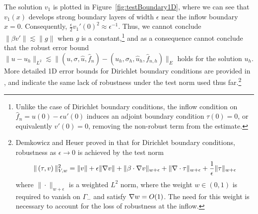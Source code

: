 The solution $v_1$ is plotted in Figure~\ref{fig:testBoundary1D}, where we can see that $v_1(x)$ develops strong boundary layers of width $\epsilon$ near the inflow boundary $x=0$. Consequently, $\frac{\epsilon}{2} v_1'(0)^2 \approx \epsilon^{-1}$. Thus, we cannot conclude $\|\beta v'\| \lesssim \|g\|$ when $g$ is a constant,\footnote{Unlike the case of Dirichlet boundary conditions, the inflow condition on $ \widehat{f}_n = u(0)-\epsilon u'(0)$ induces an adjoint boundary condition $\tau(0)=0$, or equivalently $v'(0) = 0$, removing the non-robust term from the estimate.} and as a consequence cannot conclude that the robust error bound $\|u-u_h\|_{L^2} \lesssim \|(u,\sigma,\widehat{u},\widehat{f}_n)-(u_h,\sigma_h,\widehat{u}_h,\widehat{f}_{n,h})\|_E$ holds for the solution $u_h$.  More detailed 1D error bounds for Dirichlet boundary conditions are provided in \cite{DPG3}, and indicate the same lack of robustness under the test norm used thus far.\footnote{Demkowicz and Heuer proved in \cite{DPGrobustness} that for Dirichlet boundary conditions, robustness as $\epsilon \rightarrow 0$ is achieved by the test norm
\[
\|\left(\tau, v\right)\|_{V,w}^2 = \|v\| + \epsilon \|\grad v\| + \|\beta \cdot \grad v\|_{w+\epsilon} + \| \div \tau\|_{w+\epsilon} + \frac{1}{\epsilon}\|\tau\|_{w+\epsilon}
\]
where $\|\cdot \|_{w+\epsilon}$ is a weighted $L^2$ norm, where the weight $w \in (0,1)$ is required to vanish on $\Gamma_-$ and satisfy $\grad w = O(1)$. The need for this weight is necessary to account for the loss of robustness at the inflow.} 

